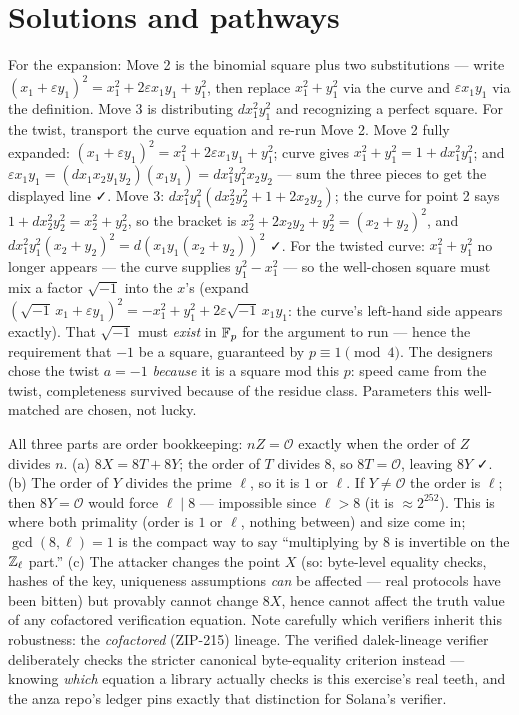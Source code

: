 \section*{Solutions and pathways}
\solutionsintro

\pathway For the expansion: Move 2 is the binomial square plus two
substitutions --- write $(x_1 + \varepsilon y_1)^2 = x_1^2 +
2\varepsilon x_1 y_1 + y_1^2$, then replace $x_1^2 + y_1^2$ via the curve
and $\varepsilon x_1 y_1$ via the definition. Move 3 is distributing
$d x_1^2 y_1^2$ and recognizing a perfect square. For the twist,
transport the curve equation and re-run Move 2.
\answer Move 2 fully expanded:
$(x_1+\varepsilon y_1)^2 = x_1^2 + 2\varepsilon x_1 y_1 + y_1^2$;
curve gives $x_1^2 + y_1^2 = 1 + dx_1^2y_1^2$; and
$\varepsilon x_1 y_1 = (d x_1 x_2 y_1 y_2)(x_1 y_1) = d x_1^2 y_1^2 x_2
y_2$ --- sum the three pieces to get the displayed line ✓. Move 3:
$d x_1^2 y_1^2 (d x_2^2 y_2^2 + 1 + 2 x_2 y_2)$; the curve for point 2
says $1 + d x_2^2 y_2^2 = x_2^2 + y_2^2$, so the bracket is
$x_2^2 + 2x_2y_2 + y_2^2 = (x_2+y_2)^2$, and
$d x_1^2 y_1^2 (x_2+y_2)^2 = d (x_1 y_1 (x_2+y_2))^2$ ✓. For the twisted
curve: $x_1^2 + y_1^2$ no longer appears --- the curve supplies
$y_1^2 - x_1^2$ --- so the well-chosen square must mix a factor
$\sqrt{-1}$ into the $x$'s (expand $(\sqrt{-1}\,x_1 + \varepsilon y_1)^2
= -x_1^2 + y_1^2 + 2\varepsilon\sqrt{-1}\,x_1 y_1$: the curve's
left-hand side appears exactly). That $\sqrt{-1}$ must \emph{exist} in
$\mathbb{F}_p$ for the argument to run --- hence the requirement that $-1$ be a
square, guaranteed by $p \equiv 1 \pmod 4$. The designers chose the
twist $a = -1$ \emph{because} it is a square mod this $p$: speed came
from the twist, completeness survived because of the residue class.
Parameters this well-matched are chosen, not lucky.

\pathway All three parts are order bookkeeping: $nZ = \mathcal{O}$
exactly when the order of $Z$ divides $n$.
\answer (a) $8X = 8T + 8Y$; the order of $T$ divides $8$, so
$8T = \mathcal{O}$, leaving $8Y$ ✓. (b) The order of $Y$ divides the
prime $\ell$, so it is $1$ or $\ell$. If $Y \neq \mathcal{O}$ the order
is $\ell$; then $8Y = \mathcal{O}$ would force $\ell \mid 8$ ---
impossible since $\ell > 8$ (it is $\approx 2^{252}$). This is where
both primality (order is $1$ or $\ell$, nothing between) and size come
in; $\gcd(8,\ell) = 1$ is the compact way to say ``multiplying by $8$ is
invertible on the $\mathbb{Z}_\ell$ part.'' (c) The attacker changes the point
$X$ (so: byte-level equality checks, hashes of the key, uniqueness
assumptions \emph{can} be affected --- real protocols have been bitten)
but provably cannot change $8X$, hence cannot affect the truth value of
any cofactored verification equation. Note carefully which verifiers
inherit this robustness: the \emph{cofactored} (ZIP-215) lineage. The
verified dalek-lineage verifier deliberately checks the stricter
canonical byte-equality criterion instead --- knowing \emph{which}
equation a library actually checks is this exercise's real teeth, and
the anza repo's ledger pins exactly that distinction for Solana's
verifier.

